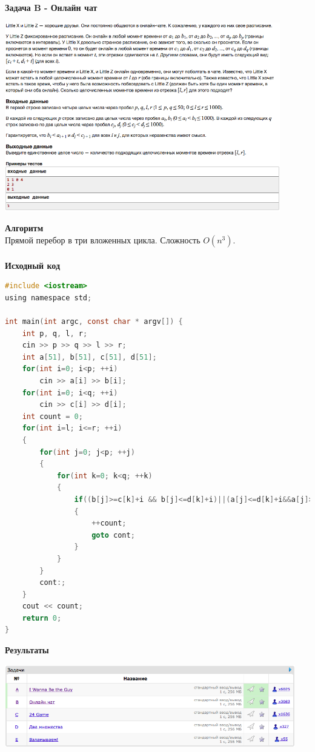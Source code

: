 \documentclass[a4paper,12pt]{article}
\begin{document}
\newpage
\textbf{{\large Задача B - Онлайн чат}} \\
\begin{center}
\includegraphics[width=0.9\textwidth]{C_268/C_268_B.png}\\ [1cm]
\end{center}
\textbf{{\large Алгоритм}} \\
Прямой перебор в три вложенных цикла. Сложность $O(n^3)$.\\ 
\\
\textbf{{\large Исходный код}}
\begin{lstlisting}[language=C]
#include <iostream>
using namespace std;

int main(int argc, const char * argv[]) {
    int p, q, l, r;
    cin >> p >> q >> l >> r;
    int a[51], b[51], c[51], d[51];
    for(int i=0; i<p; ++i)
        cin >> a[i] >> b[i];
    for(int i=0; i<q; ++i)
        cin >> c[i] >> d[i];
    int count = 0;
    for(int i=l; i<=r; ++i)
    {
        for(int j=0; j<p; ++j)
        {
            for(int k=0; k<q; ++k)
            {
                if((b[j]>=c[k]+i && b[j]<=d[k]+i)||(a[j]<=d[k]+i&&a[j]>=c[k]+i)||(c[k]+i>=a[j]&&c[k]+i<=b[j])||(d[k]+i>=a[j]&&d[k]+i<=b[j]))
                {
                    ++count;
                    goto cont;
                }
            }
        }
        cont:;
    }
    cout << count;
    return 0;
}\end{lstlisting}

\textbf{{\large Результаты}} \\
\begin{center}
\includegraphics[width=0.95\textwidth]{C_268/A_C_268_result.png}\\ [1cm]
\end{center}
\end{document}
